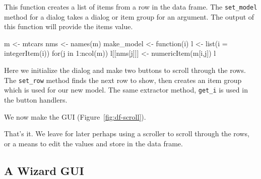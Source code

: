 \documentclass{article}
\newcommand{\code}[1]{\texttt{#1}} %
\newcommand{\generic}[1]{\code{#1}} %
\newcommand{\meth}[1]{\generic{#1}}     %
\begin{document}
This function creates a list of items from a row in the data
frame. The \meth{set\_model} method for a dialog takes a dialog or
item group for an argument. The output of this function will provide
the items value.
\begin{Schunk}
\begin{Sinput}
 m <- mtcars
 nms <- names(m)
 make_model <- function(i) {
   l <- list(i = integerItem(i))
   for(j in 1:ncol(m)) {
     l[[nms[j]]] <- numericItem(m[i,j])
   }
   l
 }
\end{Sinput}
\end{Schunk}
Here we initialize the dialog and make two buttons to scroll through
the rows. The \code{set\_row} method finds the next row to show, then
creates an item group which is used for our new model. The same
extractor method, \code{get\_i} is used in the button handlers.
\begin{Schunk}
\end{Schunk}
We now make the GUI (Figure~\ref{fig:df-scroll}).
\begin{Schunk}
\end{Schunk}
That's it. We leave for later perhaps using a scroller to scroll
through the rows, or a means to edit the values and store in the data frame.

\subsection{A Wizard GUI}
\label{sec:wizard-gui}
\end{document}
